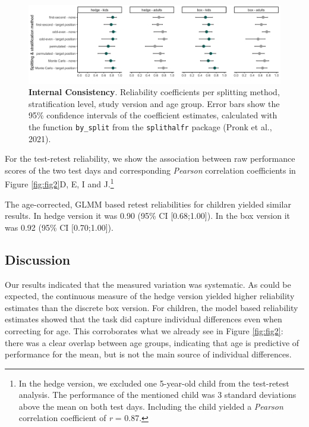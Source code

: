 \documentclass[
  man,floatsintext]{apa6}
\begin{document}
\begin{figure}

{\centering \includegraphics[width=1\linewidth]{../figures/gafo_splithalf} 

}

\caption{\textbf{Internal Consistency}.
Reliability coefficients per splitting method, stratification level, study version and age group. Error bars show the 95\% confidence intervals of the coefficient estimates, calculated with the function \texttt{by\_split} from the \texttt{splithalfr} package (Pronk et al., 2021).}\label{fig:fig3}
\end{figure}

For the test-retest reliability, we show the association between raw performance scores of the two test days and corresponding \emph{Pearson} correlation coefficients in Figure \ref{fig:fig2}D, E, I and J.\footnote{In the hedge version, we excluded one 5-year-old child from the test-retest analysis. The performance of the mentioned child was 3 standard deviations above the mean on both test days. Including the child yielded a \emph{Pearson} correlation coefficient of \emph{r} = 0.87.}

The age-corrected, GLMM based retest reliabilities for children yielded similar results. In hedge version it was 0.90 (95\% CI {[}0.68;1.00{]}).
In the box version it was 0.92 (95\% CI {[}0.70;1.00{]}).

\hypertarget{discussion-1}{%
\subsection{Discussion}\label{discussion-1}}

Our results indicated that the measured variation was systematic. As could be expected, the continuous measure of the hedge version yielded higher reliability estimates than the discrete box version. For children, the model based reliability estimates showed that the task did capture individual differences even when correcting for age. This corroborates what we already see in Figure \ref{fig:fig2}: there was a clear overlap between age groups, indicating that age is predictive of performance for the mean, but is not the main source of individual differences.
\end{document}
